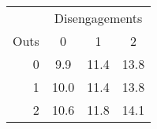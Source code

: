 \begin{tabular}{r|ccc}
 & \multicolumn{3}{c}{Disengagements}\\
Outs & 0 & 1 & 2 \\
  \hline
0 & 9.9 & 11.4 & 13.8 \\ 
  1 & 10.0 & 11.4 & 13.8 \\ 
  2 & 10.6 & 11.8 & 14.1 \\ 
\end{tabular}
